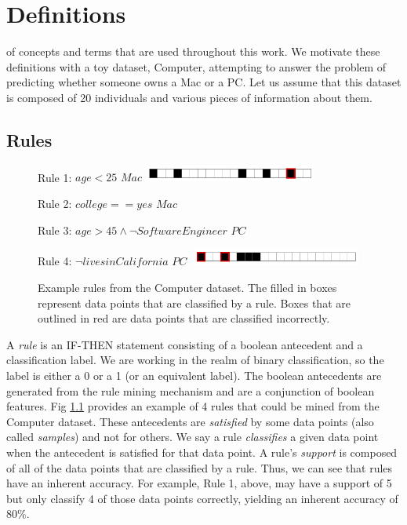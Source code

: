 \chapter{Definitions}\label{ch:definitions}
 of concepts and terms that are used throughout this work. 
We motivate these definitions with a toy dataset, Computer, attempting to answer the problem of predicting whether someone owns a Mac or a PC.
Let us assume that this dataset is composed of 20 individuals and various pieces of information about them.

\section{Rules}

\begin{figure}[t!]
\begin{algorithmic}
\normalsize
\State Rule 1: \bif $age < 25$ \bthen $Mac$\,
\includegraphics[width=0.5\textwidth]{figs/rule_1_cap.png}

\State Rule 2: \bif $college == yes$ \bthen $Mac$\,

\State Rule 3: \bif $age > 45 \wedge \neg Software Engineer$ \bthen $PC$\,

\State Rule 4: \bif $\neg lives in California$ \bthen $PC$\,
\includegraphics[width=0.5\textwidth]{figs/rule_4_cap.png}

\end{algorithmic}
\caption{Example rules from the Computer dataset.
The filled in boxes represent data points that are classified by a rule.
Boxes that are outlined in red are data points that are classified incorrectly.
}
\label{fig:rules}
\end{figure}

A \textit{rule} is an IF-THEN statement consisting of a boolean antecedent and a classification label.
We are working in the realm of binary classification, so the label is either a 0 or a 1 (or an equivalent label).
The boolean antecedents are generated from the rule mining mechanism \cite{LethamRuMcMa15} and are a conjunction of boolean features.
Fig \ref{fig:rules} provides an example of 4 rules that could be mined from the Computer dataset.
These antecedents are \textit{satisfied} by some data points (also called \textit{samples}) and not for others.
We say a rule \textit{classifies} a given data point when the antecedent is satisfied for that data point.
A rule's \textit{support} is composed of all of the data points that are classified by a rule.
Thus, we can see that rules have an inherent accuracy.
For example, Rule 1, above, may have a support of 5 but only classify 4 of those data points correctly, yielding an inherent accuracy of 80\%.

